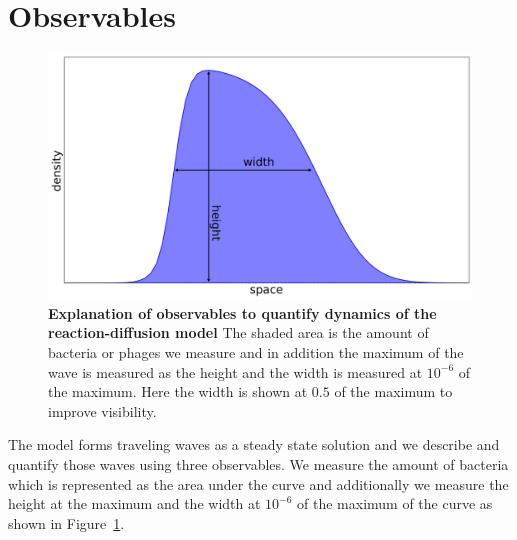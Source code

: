 \section{Observables}
\begin{figure}
\centering
\includegraphics[width=\linewidth]{graphics/2025_09_30_phages_fig2.png}
\caption{\textbf{Explanation of observables to quantify dynamics of the reaction-diffusion model} The shaded area is the amount of bacteria or phages we measure and in addition the maximum of the wave is measured as the height and the width is measured at $10^{-6}$ of the maximum. Here the width is shown at $0.5$ of the maximum to improve visibility.}
\label{fig:observable_sketch}
\end{figure}
The model forms traveling waves as a steady state solution and we describe and quantify those waves using three observables. We measure the amount of bacteria which is represented as the area under the curve and additionally we measure the height at the maximum and the width at $10^{-6}$ of the maximum of the curve as shown in Figure~\ref{fig:observable_sketch}.
